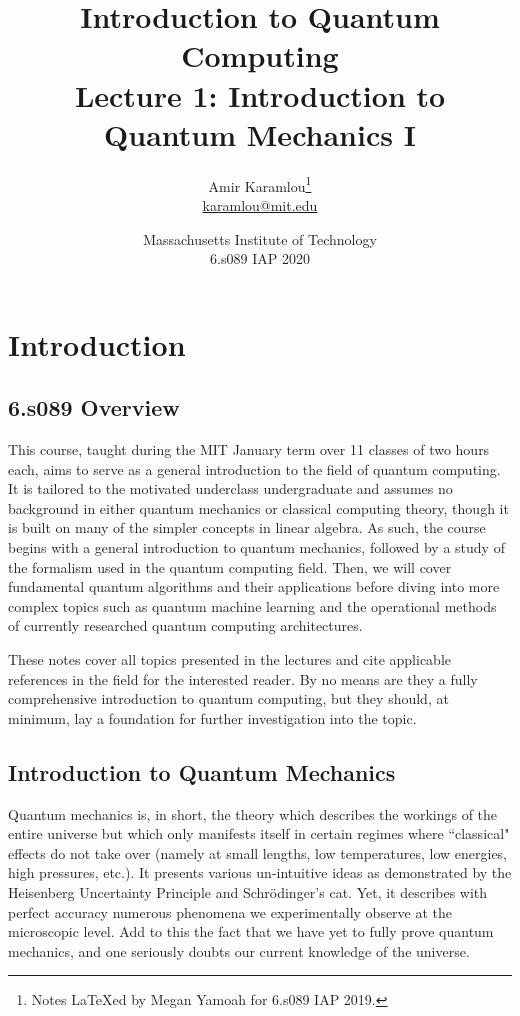 \documentclass[11pt]{article} %
\author{Amir Karamlou\footnote{Notes LaTeXed by Megan Yamoah for 6.s089 IAP 2019.}\\\href{mailto:karamlou@mit.edu}{karamlou@mit.edu}}
\title{Introduction to Quantum Computing\\Lecture 1: Introduction to Quantum Mechanics I}
\date{Massachusetts Institute of Technology\\6.s089 IAP 2020}
\begin{document}
\maketitle
\newpage
\tableofcontents
\newpage


\section{Introduction}
\subsection{6.s089 Overview}
This course, taught during the MIT January term over 11 classes of two hours each, aims to serve as a general introduction to the field of quantum computing. It is tailored to the motivated underclass undergraduate and assumes no background in either quantum mechanics or classical computing theory, though it is built on many of the simpler concepts in linear algebra. As such, the course begins with a general introduction to quantum mechanics, followed by a study of the formalism used in the quantum computing field. Then, we will cover fundamental quantum algorithms and their applications before diving into more complex topics such as quantum machine learning and the operational methods of currently researched quantum computing architectures.

These notes cover all topics presented in the lectures and cite applicable references in the field for the interested reader. By no means are they a fully comprehensive introduction to quantum computing, but they should, at minimum, lay a foundation for further investigation into the topic.

\subsection{Introduction to Quantum Mechanics}

Quantum mechanics is, in short, the theory which describes the workings of the entire universe but which only manifests itself in certain regimes where ``classical" effects do not take over (namely at small lengths, low temperatures, low energies, high pressures, etc.). It presents various un-intuitive ideas as demonstrated by the Heisenberg Uncertainty Principle and Schr\"odinger's cat. Yet, it describes with perfect accuracy numerous phenomena we experimentally observe at the microscopic level. Add to this the fact that we have yet to fully prove quantum mechanics, and one seriously doubts our current knowledge of the universe.
\end{document}
